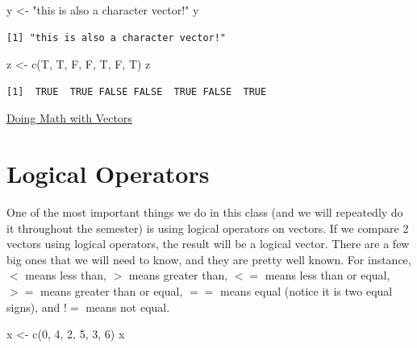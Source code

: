 \documentclass[
  letterpaper,
  DIV=11,
  numbers=noendperiod]{scrreprt}
\newenvironment{Shaded}{\begin{snugshade}}{\end{snugshade}}
\newcommand{\DecValTok}[1]{\textcolor[rgb]{0.68,0.00,0.00}{#1}}
\newcommand{\FunctionTok}[1]{\textcolor[rgb]{0.28,0.35,0.67}{#1}}
\newcommand{\NormalTok}[1]{\textcolor[rgb]{0.00,0.23,0.31}{#1}}
\newcommand{\OtherTok}[1]{\textcolor[rgb]{0.00,0.23,0.31}{#1}}
\newcommand{\StringTok}[1]{\textcolor[rgb]{0.13,0.47,0.30}{#1}}
\begin{document}
\begin{Shaded}
\begin{Highlighting}[]
\NormalTok{y }\OtherTok{\textless{}{-}} \StringTok{"this is also a character vector!"}
\NormalTok{y}
\end{Highlighting}
\end{Shaded}

\begin{verbatim}
[1] "this is also a character vector!"
\end{verbatim}

\begin{Shaded}
\begin{Highlighting}[]
\NormalTok{z }\OtherTok{\textless{}{-}} \FunctionTok{c}\NormalTok{(T, T, F, F, T, F, T)}
\NormalTok{z}
\end{Highlighting}
\end{Shaded}

\begin{verbatim}
[1]  TRUE  TRUE FALSE FALSE  TRUE FALSE  TRUE
\end{verbatim}

\begin{watch}{}{}
    \href{https://youtu.be/L58Xl50txa0}{Doing Math with Vectors}
\end{watch}

\section{Logical Operators}\label{logical-operators}

One of the most important things we do in this class (and we will
repeatedly do it throughout the semester) is using logical operators on
vectors. If we compare 2 vectors using logical operators, the result
will be a logical vector. There are a few big ones that we will need to
know, and they are pretty well known. For instance, \(<\) means less
than, \(>\) means greater than, \(<=\) means less than or equal, \(>=\)
means greater than or equal, \(==\) means equal (notice it is two equal
signs), and \(!=\) means not equal.

\begin{Shaded}
\begin{Highlighting}[]
\NormalTok{x }\OtherTok{\textless{}{-}} \FunctionTok{c}\NormalTok{(}\DecValTok{0}\NormalTok{, }\DecValTok{4}\NormalTok{, }\DecValTok{2}\NormalTok{, }\DecValTok{5}\NormalTok{, }\DecValTok{3}\NormalTok{, }\DecValTok{6}\NormalTok{)}
\NormalTok{x}
\end{Highlighting}
\end{Shaded}
\end{document}
